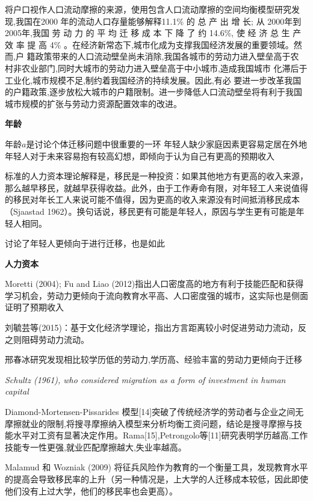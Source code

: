 \documentclass[a4paper,12pt,oneside]{book} %
\begin{document}
\cite{WangLiLiWoGuoRenKouQianYiChengBenChengShiGuiMoYuShengChanLu2020}将户口视作人口流动摩擦的来源，使用包含人口流动摩擦的空间均衡模型研究发现,我国在2000 年的流动人口存量能够解释11.1\% 的 总 产 出 增 长; 从  2000年到2005年,我国 劳 动 力 的 平 均 迁 移 成 本 下 降 了 约 14.6\%, 使 经 济 总  生 产 效 率 提 高 4\% 。在经济新常态下,城市化成为支撑我国经济发展的重要领域。然而,户  籍政策带来的人口流动壁垒尚未消除,我国各城市的劳动力进入壁垒高于农  村非农业部门,同时大城市的劳动力进入壁垒高于中小城市,造成我国城市  化滞后于工业化,城市规模不足,制约着我国经济的持续发展。因此,有必  要进一步改革我国的户籍政策,逐步放松大城市的户籍限制。进一步降低人口流动壁垒将有利于我国城市规模的扩张与劳动力资源配置效率的改进。


\textbf{年龄}

年龄$a$是讨论个体迁移问题中很重要的一环
年轻人缺少家庭因素更容易定居在外地
年轻人对于未来容易抱有较高幻想，即倾向于认为自己有更高的预期收入

标准的人力资本理论解释是，移民是一种投资：如果其他地方有更高的收入来源，那么越早移民，就越早获得收益。此外，由于工作寿命有限，对年轻工人来说值得的移民对年长工人来说可能不值得，因为更高的收入来源没有时间抵消移民成本（Sjaastad 1962）。换句话说，移民更有可能是年轻人，原因与学生更有可能是年轻人相同。

\cite{wozniakAreCollegeGraduates2010}讨论了年轻人更倾向于进行迁移，\cite{molloyInternalMigrationUnited2011}也是如此



\textbf{人力资本}

Moretti (2004); Fu and Liao (2012)指出人口密度高的地方有利于技能匹配和获得学习机会，劳动力更倾向于流向教育水平高、人口密度强的城市，这实际也是侧面证明了预期收入

刘毓芸等(2015)\cite{LiuYuYunLaoDongLiKuaFangYanLiuDongDeDaoUXingMoShi2015}：基于文化经济学理论，指出方言距离较小时促进劳动力流动，反之则阻碍劳动力流动。

邢春冰研究发现相比较学历低的劳动力,学历高、经验丰富的劳动力更倾向于迁移

\textit{Schultz (1961), who considered migration as a form of investment in human capital}

Diamond-Mortensen-Pissarides 模型[14]突破了传统经济学的劳动者与企业之间无摩擦就业的限制,将搜寻摩擦纳入模型来分析均衡工资问题，结论是搜寻摩擦与技能水平对工资有显著决定作用。Rama[15],Petrongolo等[11]研究表明学历越高,工作技能专一性更强,就业匹配摩擦越大,失业率越高。

Malamud 和 Wozniak (2009) 将征兵风险作为教育的一个衡量工具，发现教育水平的提高会导致移民率的上升（另一种情况是，上大学的人迁移成本较低，因此即使他们没有上过大学，他们的移民率也会更高）。
\end{document}
